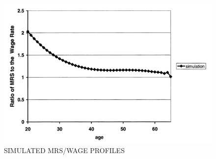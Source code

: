 \hypertarget{SimulatedMRS}{}
\begin{figure}[tbp]
  \centerline{\includegraphics[width=6in]{../FigDir/Figure6.png}}
  \caption{SIMULATED MRS/WAGE PROFILES}
  \label{fig:SimulatedMRS}
\end{figure}
